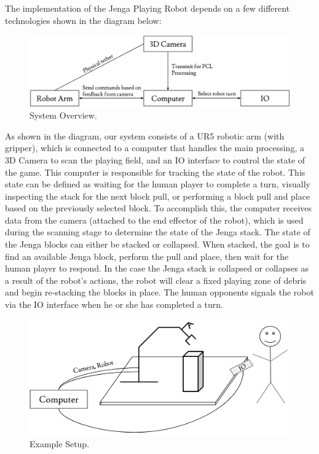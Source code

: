 

The implementation of the Jenga Playing Robot depends on a few different technologies shown in the diagram below:

\begin{figure}[h!]
\centering
\includegraphics[width=0.8\linewidth]{images/sys_overview.png}
\caption{System Overview.}
\end{figure}

As shown in the diagram, our system consists of a UR5 robotic arm (with gripper), which is connected to a computer that handles the main processing, a 3D Camera to scan the playing field, and an IO interface to control the state of the game. This computer is responsible for tracking the state of the robot. This state can be defined as waiting for the human player to complete a turn, visually inspecting the stack for the next block pull, or performing a block pull and place based on the previously selected block. To accomplish this, the computer receives data from the camera (attached to the end effector of the robot), which is used during the scanning stage to determine the state of the Jenga stack. The state of the Jenga blocks can either be stacked or collapsed. When stacked, the goal is to find an available Jenga block, perform the pull and place, then wait for the human player to respond. In the case the Jenga stack is collapsed or collapses as a result of the robot's actions, the robot will clear a fixed playing zone of debris and begin re-stacking the blocks in place. The human opponents signals the robot via the IO interface when he or she has completed a turn.  

\begin{figure}[h!]
\centering
\includegraphics[width=0.78\linewidth]{images/system_setup.png}
\caption{Example Setup.}
\end{figure}
